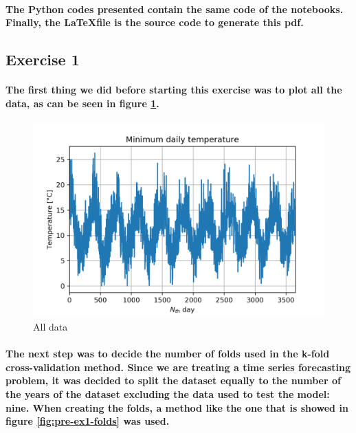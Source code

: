 \documentclass[a4paper]{article}
\begin{document}
\paragraph{The Python codes presented contain the same code of the notebooks. Finally, the \LaTeX file is the source code to generate this pdf.}

\subsection{Exercise 1}

\paragraph{The first thing we did before starting this exercise was to plot all the data, as can be seen in figure \ref{fig:pre-ex1-0}.}

\begin{figure}[ht]
    \centering
    \includegraphics[width=12cm]{figure_0_all_data}
    \caption{All data}
    \label{fig:pre-ex1-0}
\end{figure}

\paragraph{The next step was to decide the number of folds used in the k-fold cross-validation method. Since we are treating a time series forecasting problem, it was decided to split the dataset equally to the number of the years of the dataset excluding the data used to test the model: nine. When creating the folds, a method like the one that is showed in figure \ref{fig:pre-ex1-folds} was used.}
\end{document}

